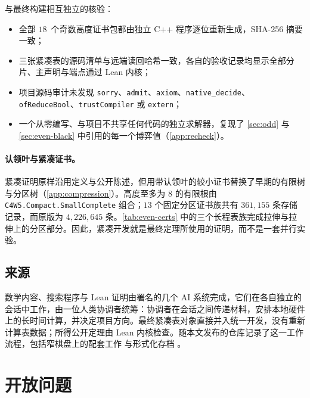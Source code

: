 \documentclass[11pt,a4paper]{article}
\theoremstyle{zhthm}
\newcommand{\code}[1]{{\upshape\texttt{\small\nolinkurl{#1}}}}
\begin{document}
与最终构建相互独立的核验：
\begin{itemize}
  \item 全部 $18$~个奇数高度证书包都由独立 C++ 程序逐位重新生成，SHA-256 摘要一致；
  \item 三张紧凑表的源码清单与远端读回哈希一致，各自的验收记录均显示全部分片、主声明与端点通过 Lean 内核；
  \item 项目源码审计未发现 \code{sorry}、\code{admit}、\code{axiom}、\code{native_decide}、\code{ofReduceBool}、\code{trustCompiler} 或 \code{extern}；
  \item 一个从零编写、与项目不共享任何代码的独立求解器，复现了 \cref{sec:odd} 与 \cref{sec:even-black} 中引用的每一个博弈值（\cref{app:recheck}）。
\end{itemize}

\paragraph{认领叶与紧凑证书。}紧凑证明原样沿用定义与公开陈述，但用带认领叶的较小证书替换了早期的有限树与分区树（\cref{app:compression}）。高度至多为 $8$ 的有限根由 \code{C4W5.Compact.SmallComplete} 组合；$13$ 个固定分区证书族共有 $361{,}155$ 条存储记录，而原版为 $4{,}226{,}645$ 条。\cref{tab:even-certs} 中的三个长程表族完成拉伸与拉伸上的分区部分。因此，紧凑开发就是最终定理所使用的证明，而不是一套并行实验。

\subsection{来源}

数学内容、搜索程序与 Lean 证明由署名的几个 AI 系统完成，它们在各自独立的会话中工作，由一位人类协调者统筹：协调者在会话之间传递材料，安排本地硬件上的长时间计算，并决定项目方向。最终紧凑表对象直接并入统一开发，没有重新计算表数据；所得公开定理由 Lean 内核检查。随本文发布的仓库记录了这一工作流程，包括窄棋盘上的配套工作 \cite{narrow14,fourcol} 与形式化存档 \cite{c4w5archive}。

\section{开放问题}
\label{sec:open}
\end{document}
